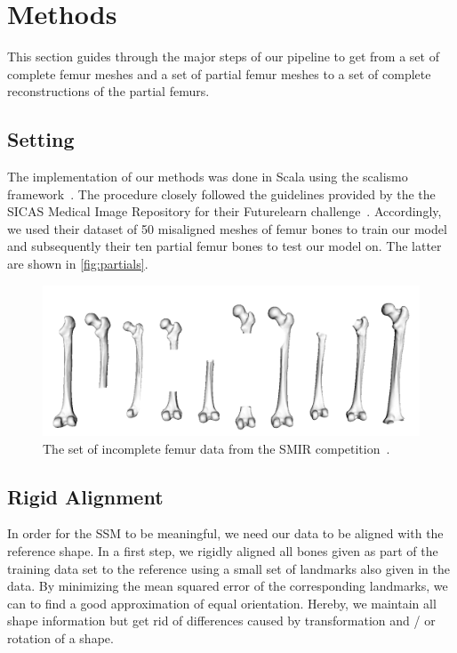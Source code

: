 \section{Methods}
\label{sec:methods}

This section guides through the major steps of our pipeline to get from a set of complete femur meshes and a set of partial femur meshes to a set of complete reconstructions of the partial femurs.


\subsection{Setting}
\label{subsec:setting}

The implementation of our methods was done in Scala using the scalismo framework~\cite{scalismo}.
The procedure closely followed the guidelines provided by the the SICAS Medical Image Repository for their Futurelearn challenge~\cite{smir}. 
Accordingly, we used their dataset of 50 misaligned meshes of femur bones to train our model and subsequently their ten partial femur bones to test our model on.
The latter are shown in \autoref{fig:partials}.

\begin{figure}
	\centering
  \includegraphics[width=.8\textwidth]{./Figures/partial_summary}
  \caption{The set of incomplete femur data from the SMIR competition~\cite{smir}.}
  \label{fig:partials}
\end{figure}


\subsection{Rigid Alignment}
\label{subsec:rigid}

In order for the SSM to be meaningful, we need our data to be aligned with the reference shape.
In a first step, we rigidly aligned all bones given as part of the training data set to the reference using a small set of landmarks also given in the data.
By minimizing the mean squared error of the corresponding landmarks, we can to find a good approximation of equal orientation.
Hereby, we maintain all shape information but get rid of differences caused by transformation and / or rotation of a shape.

